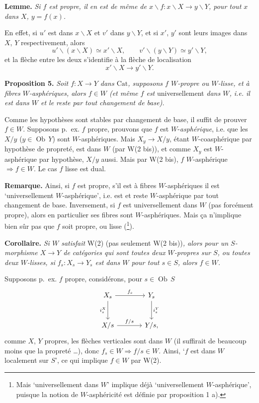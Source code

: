 \documentclass[11pt]{article}
\newcommand{\printedpage}[1]{\marginpar{\footnotesize p.~#1}}
\newcommand{\msp}[1]{\marginpar{\footnotesize [#1]}}
\newcommand{\Cat}{\mathrm{Cat}}
\newcommand{\Ob}{\operatorname{Ob}}
\begin{document}
\textbf{Lemme.} \textit{Si $f$ est propre, il en est de même de $x\backslash f : x\backslash X \longrightarrow y\backslash Y$, pour tout $x$ dans $X$, $y = f(x)$.}

\printedpage{24}
En effet, si $u'$ est dans $x\backslash X$ et $v'$ dans $y\backslash Y$, et si $x'$, $y'$ sont leurs images dans $X$, $Y$ respectivement, alors
\[
u'\backslash(x\backslash X)\simeq x'\backslash X,\qquad v'\backslash(y\backslash Y)\simeq y'\backslash Y,
\]
et la flèche entre les deux s'identifie à la flèche de localisation
\[
x'\backslash X\longrightarrow y'\backslash Y.
\]

\textbf{Proposition 5.} \textit{Soit $f : X\longrightarrow Y$ dans $\Cat$, supposons $f$ $W$-propre ou $W$-lisse, et à fibres $W$-asphériques, alors $f\in W$ (et même $f$ est} \textup{universellement} \textit{dans $W$, i.e. il est dans $W$ et le reste par tout changement de base).}

\leavevmode\msp{page 30}Comme les hypothèses sont stables par changement de base, il suffit de prouver $f\in W$. Supposons p.~ex. $f$ propre, prouvons que $f$ est $W$-\textit{asphérique}, i.e. que les $X/y$ ($y\in\Ob\,Y$) sont $W$-asphériques. Mais $X_y\longrightarrow X/y$, étant $W$-coasphérique par hypothèse de propreté, est dans $W$ (par W(2 bis)), et comme $X_y$ est $W$-asphérique par hypothèse, $X/y$ aussi. Mais par W(2 bis), $f$ $W$-asphérique $\Longrightarrow f\in W$. Le cas $f$ lisse est dual.

\textbf{Remarque.} Ainsi, si $f$ est propre, s'il est à fibres $W$-asphériques il est `universellement $W$-asphérique', i.e. est et reste $W$-asphérique par tout changement de base. Inversement, si $f$ est universellement dans $W$ (pas forcément propre), alors en particulier ses fibres sont $W$-asphériques. Mais ça n'implique bien sûr pas que $f$ soit propre, ou lisse (\footnote[44]{Mais `universellement dans $W$' implique déjà `universellement $W$-asphérique', puisque la notion de $W$-asphéricité est définie par proposition 1 a).}).

\textbf{Corollaire.} \textit{Si $W$ satisfait} \textup{W(2) (pas seulement W(2 bis))}\textit{, alors pour un $S$-morphisme $X\longrightarrow Y$ de catégories qui sont toutes deux $W$-propres sur $S$, ou toutes deux $W$-lisses, si $f_s : X_s\longrightarrow Y_s$ est dans $W$ pour tout $s\in S$, alors $f\in W$.}

\leavevmode\msp{page 31}Supposons p.~ex. $f$ propre, considérons, pour $s\in\Ob\,S$
\[
\begin{tikzcd}[row sep=large, column sep=large]
X_s \arrow[r, "f_s"] \arrow[d, "i_s^X"'] & Y_s \arrow[d, "i_s^Y"] \\
X/s \arrow[r, "f/s"] & Y/s,
\end{tikzcd}
\]
comme $X$, $Y$ propres, les flèches verticales sont dans $W$ (il suffirait de beaucoup moins que la propreté \dots), donc $f_s\in W\Longrightarrow f/s\in W$. Ainsi, `$f$ est dans $W$ localement sur $S$', ce qui implique $f\in W$ par W(2).
\end{document}
